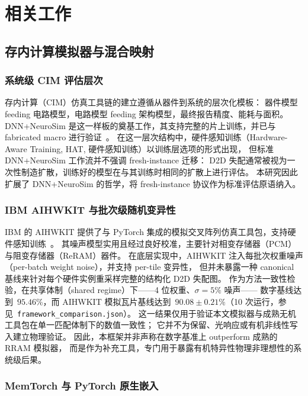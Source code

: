 \chapter{相关工作}
\label{chap:related-work}

\section{存内计算模拟器与混合映射}

\subsection{系统级 CIM 评估层次}

存内计算（CIM）仿真工具链的建立遵循从器件到系统的层次化模板：
器件模型 feeding 电路模型，电路模型 feeding 架构模型，最终报告精度、能耗与面积。
DNN+NeuroSim 是这一样板的奠基工作，其支持完整的片上训练，并已与 fabricated macro 进行验证~\citep{peng2020dnnneurosim}。
在这一层次结构中，硬件感知训练（Hardware-Aware Training, HAT, 硬件感知训练）以训练层选项的形式出现，
但标准 DNN+NeuroSim 工作流并不强调 fresh-instance 迁移：
D2D 失配通常被视为一次性制造扩散，训练好的模型在与其训练时相同的扩散上进行评估。
本研究因此扩展了 DNN+NeuroSim 的哲学，将 fresh-instance 协议作为标准评估原语纳入。

\subsection{IBM AIHWKIT 与批次级随机变异性}

IBM 的 AIHWKIT 提供了与 PyTorch 集成的模拟交叉阵列仿真工具包，支持硬件感知训练~\citep{rasch2021aihwkit}。
其噪声模型实用且经过良好校准，主要针对相变存储器（PCM）与阻变存储器（ReRAM）器件。
在底层实现中，AIHWKIT 注入每批次权重噪声（per-batch weight noise），并支持 per-tile 变异性，
但并未暴露一种 canonical 基线来针对每个硬件实例重采样完整的结构化 D2D 失配图。
作为方法一致性检验，在共享体制（shared regime）下——4 位权重、$\sigma=5\%$ 噪声——
数字基线达到~$95.46\%$，而 AIHWKIT 模拟瓦片基线达到~$90.08\pm0.21\%$（10 次运行，参见~\texttt{framework\_comparison.json}）。
这一结果仅用于验证本文模拟器与成熟无机工具包在单一匹配体制下的数值一致性；
它并不为保留、光响应或有机非线性写入建立物理验证。
因此，本框架并非声称在数字基准上 outperform 成熟的 RRAM 模拟器，
而是作为补充工具，专门用于暴露有机特异性物理非理想性的系统级后果。

\subsection{MemTorch 与 PyTorch 原生嵌入}

